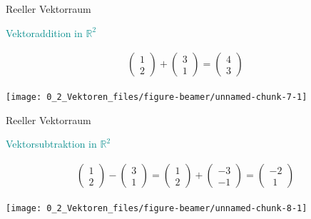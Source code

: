 \documentclass[
  8pt,
  ignorenonframetext,
]{beamer}
\begin{document}
\begin{frame}{Reeller Vektorraum}
\protect\hypertarget{reeller-vektorraum-6}{}
\vspace{3mm}

\textcolor{darkcyan}{Vektoraddition in $\mathbb{R}^2$}

\vspace{9pt}
\small

\begin{align*}
\begin{pmatrix}
1 \\ 2
\end{pmatrix}
+
\begin{pmatrix}
3 \\ 1
\end{pmatrix}
=
\begin{pmatrix}
4 \\ 3
\end{pmatrix}
\end{align*}

\begin{center}\texttt{[image: 0\_2\_Vektoren\_files/figure-beamer/unnamed-chunk-7-1]} \end{center}
\end{frame}

\begin{frame}{Reeller Vektorraum}
\protect\hypertarget{reeller-vektorraum-7}{}
\vspace{3mm}

\textcolor{darkcyan}{Vektorsubtraktion in $\mathbb{R}^2$}

\vspace{9pt}
\small

\begin{align*}
\begin{pmatrix}
1 \\ 2
\end{pmatrix}
-
\begin{pmatrix}
3 \\ 1
\end{pmatrix}
=
\begin{pmatrix}
1 \\ 2
\end{pmatrix}
+
\begin{pmatrix}
-3 \\ -1
\end{pmatrix}
=
\begin{pmatrix}
-2 \\ \,\, 1
\end{pmatrix}
\end{align*}

\begin{center}\texttt{[image: 0\_2\_Vektoren\_files/figure-beamer/unnamed-chunk-8-1]} \end{center}
\end{frame}
\end{document}
